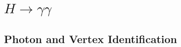 \documentclass{beamer}
\begin{document}

\section{$H \rightarrow \gamma\gamma$}

\subsection{Photon and Vertex Identification }

\end{document}
